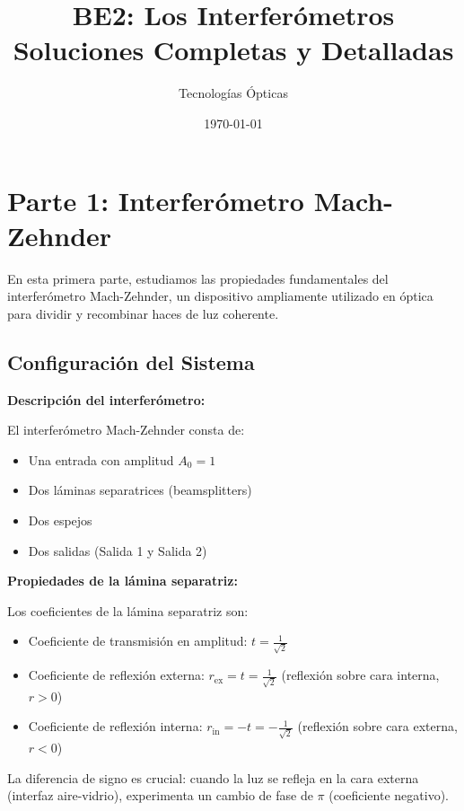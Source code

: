 \documentclass[12pt,a4paper]{article}
\title{\textbf{BE2: Los Interferómetros} \\ Soluciones Completas y Detalladas}
\author{Tecnologías Ópticas}
\date{\today}
\begin{document}
\maketitle
\tableofcontents
\newpage

\section{Parte 1: Interferómetro Mach-Zehnder}

En esta primera parte, estudiamos las propiedades fundamentales del interferómetro Mach-Zehnder, un dispositivo ampliamente utilizado en óptica para dividir y recombinar haces de luz coherente.

\subsection{Configuración del Sistema}

\textbf{Descripción del interferómetro:}

El interferómetro Mach-Zehnder consta de:
\begin{itemize}
    \item Una entrada con amplitud $A_0 = 1$
    \item Dos láminas separatrices (beamsplitters)
    \item Dos espejos
    \item Dos salidas (Salida 1 y Salida 2)
\end{itemize}

\textbf{Propiedades de la lámina separatriz:}

Los coeficientes de la lámina separatriz son:
\begin{itemize}
    \item Coeficiente de transmisión en amplitud: $t = \frac{1}{\sqrt{2}}$
    \item Coeficiente de reflexión externa: $r_{\text{ex}} = t = \frac{1}{\sqrt{2}}$ (reflexión sobre cara interna, $r > 0$)
    \item Coeficiente de reflexión interna: $r_{\text{in}} = -t = -\frac{1}{\sqrt{2}}$ (reflexión sobre cara externa, $r < 0$)
\end{itemize}

La diferencia de signo es crucial: cuando la luz se refleja en la cara externa (interfaz aire-vidrio), experimenta un cambio de fase de $\pi$ (coeficiente negativo).
\end{document}
